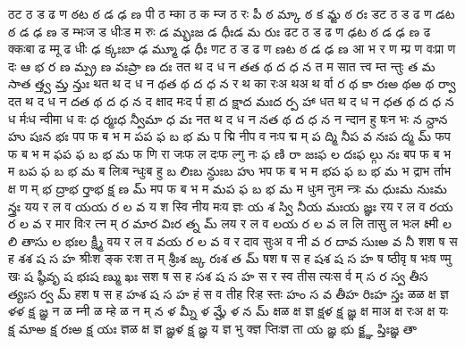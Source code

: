 \documentclass{article}
\begin{document}
\card
{ठ}{ट ठ ड ढ ण}%
{ఠ}{ట ఠ డ ఢ ణ}
{{पी ठ म्}{का ठ क म्}{ज ठ रः}}%
{{పీ ఠ మ్}{కా ఠ క మ్}{జ ఠ రః}}
\card
{ड}{ट ठ ड ढ ण}%
{డ}{ట ఠ డ ఢ ణ}
{{ड म्भः}{ज ड धीः}{ड म रुः}}%
{{డ మ్భః}{జ డ ధీః}{డ మ రుః}}
\card
{ढ}{ट ठ ड ढ ण}%
{ఢ}{ట ఠ డ ఢ ణ}
{{ढ क्कः}{बा ढ म्}{मू ढ धीः}}%
{{ఢ క్కః}{బా ఢ మ్}{మూ ఢ ధీః}}
\card
{ण}{ट ठ ड ढ ण}%
{ణ}{ట ఠ డ ఢ ణ}
{{आ भ र ण म्}{प्र ण वः}{प्रा ण दः}}%
{{ఆ భ ర ణ మ్}{ప్ర ణ వః}{ప్రా ణ దః}}
\card
{त}{त थ द ध न}%
{త}{త థ ద ధ న}
{{त म सा}{त त्त्व म्}{त न्तुः}}%
{{త మ సా}{త త్త్వ మ్}{త న్తుః}}
\card
{थ}{त थ द ध न}%
{థ}{త థ ద ధ న}
{{र थ का रः}{अ थ}{अ थ र्वा}}%
{{ర థ కా రః}{అ థ}{అ థ ర్వా}}
\card
{द}{त थ द ध न}%
{ద}{త థ ద ధ న}
{{द क्षा}{द मः}{द र्प हा}}%
{{ద క్షా}{ద మః}{ద ర్ప హా}}
\card
{ध}{त थ द ध न}%
{ధ}{త థ ద ధ న}
{{ध र्मः}{ध न्वी}{मा ध वः}}%
{{ధ ర్మః}{ధ న్వీ}{మా ధ వః}}
\card
{न}{त थ द ध न}%
{న}{త థ ద ధ న}
{{न न्दा}{न हु षः}{न भः}}%
{{న న్దా}{న హు షః}{న భః}}
\card
{प}{प फ ब भ म}%
{ప}{ప ఫ బ భ మ}
{{प द्मि नी}{प व नः}{प द्म म्}}%
{{ప ద్మి నీ}{ప వ నః}{ప ద్మ మ్}}
\card
{फ}{प फ ब भ म}%
{ఫ}{ప ఫ బ భ మ}
{{फ णि रा जः}{फ ल दः}{फ ल्गु नः}}%
{{ఫ ణి రా జః}{ఫ ల దః}{ఫ ల్గు నః}}
\card
{ब}{प फ ब भ म}%
{బ}{ప ఫ బ భ మ}
{{ब लिः}{ब न्धुः}{ब हु}}%
{{బ లిః}{బ న్ధుః}{బ హు}}
\card
{भ}{प फ ब भ म}%
{భ}{ప ఫ బ భ మ}
{{भ द्रा}{भ र्ता}{भ क्ष ण म्}}%
{{భ ద్రా}{భ ర్తా}{భ క్ష ణ మ్}}
\card
{म}{प फ ब भ म}%
{మ}{ప ఫ బ భ మ}
{{म धुः}{म नुः}{म न्त्रः}}%
{{మ ధుః}{మ నుః}{మ న్త్రః}}
\card
{य}{य र ल व}%
{య}{య ర ల వ}
{{य श स्वि नी}{य मः}{य ज्ञः}}%
{{య శ స్వి నీ}{య మః}{య జ్ఞః}}
\card
{र}{य र ल व}%
{ర}{య ర ల వ}
{{र मा}{र विः}{र त्न म्}}%
{{ర మా}{ర విః}{ర త్న మ్}}
\card
{ल}{य र ल व}%
{ల}{య ర ల వ}
{{ल लि ता}{सु ल भः}{ल क्ष्मी}}%
{{ల లి తా}{సు ల భః}{ల క్ష్మీ}}
\card
{व}{य र ल व}%
{వ}{య ర ల వ}
{{व र दा}{व सुः}{अ व नी}}%
{{వ ర దా}{వ సుః}{అ వ నీ}}
\card
{श}{श ष स ह}%
{శ}{శ ష స హ}
{{श्रीः}{श ङ्क रः}{श त म्}}%
{{శ్రీః}{శ ఙ్క రః}{శ త మ్}}
\card
{ष}{श ष स ह}%
{ష}{శ ష స హ}
{{ष ष्ठी}{वृ ष भः}{ष ण्मु खः}}%
{{ష ష్ఠీ}{వృ ష భః}{ష ణ్ము ఖః}}
\card
{स}{श ष स ह}%
{స}{శ ష స హ}
{{स र स्व ती}{स त्यः}{स र्व म्}}%
{{స ర స్వ తీ}{స త్యః}{స ర్వ మ్}}
\card
{ह}{श ष स ह}%
{హ}{శ ష స హ}
{{हं स व ती}{ह रिः}{ह स्तः}}%
{{హం స వ తీ}{హ రిః}{హ స్తః}}
\card
{ळ}{ळ क्ष ज्ञ}%
{ళ}{ళ క్ష జ్ఞ}
{{न ळ म्}{नी ळ म्}{हे ळ न म्}}%
{{న ళ మ్}{నీ ళ మ్}{హే ళ న మ్}}
\card
{क्ष}{ळ क्ष ज्ञ}%
{క్ష}{ళ క్ష జ్ఞ}
{{क्ष मा}{अ क्ष रः}{अ क्ष यः}}%
{{క్ష మా}{అ క్ష రః}{అ క్ష యః}}
\card
{ज्ञ}{ळ क्ष ज्ञ}%
{జ్ఞ}{ళ క్ష జ్ఞ}
{{य ज्ञ भु क्}{ज्ञ प्तिः}{ज्ञ ता}}%
{{య జ్ఞ భు క్}{జ్ఞ ప్తిః}{జ్ఞ తా}}
\end{document}
